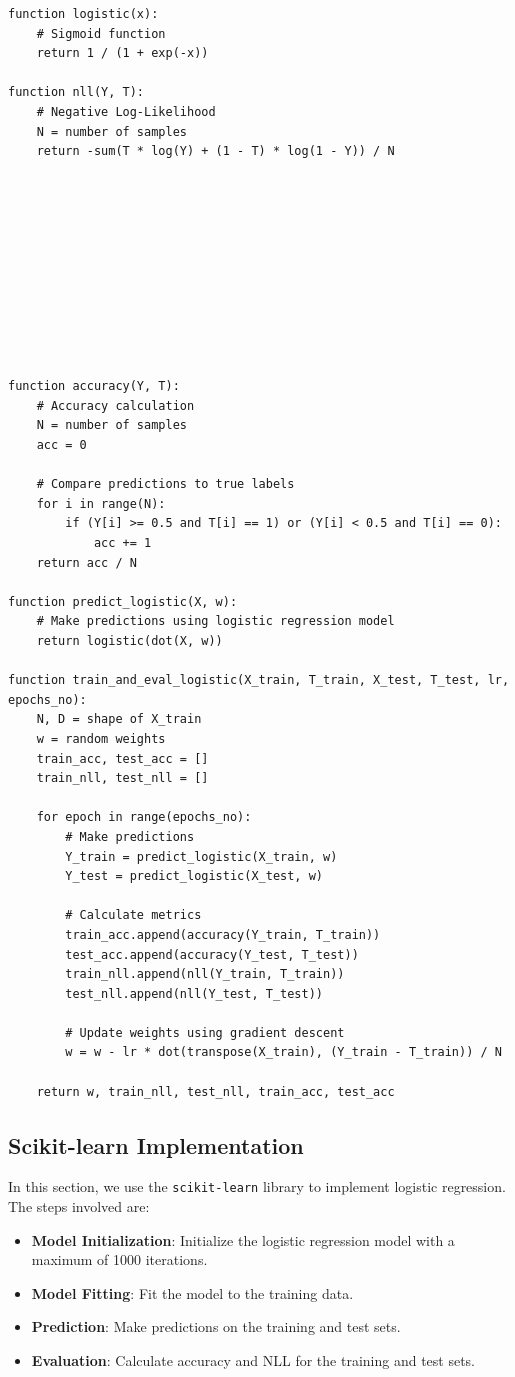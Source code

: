 \documentclass[a4paper,12pt]{article}
\begin{document}
\begin{verbatim}
function logistic(x):
    # Sigmoid function
    return 1 / (1 + exp(-x))

function nll(Y, T):
    # Negative Log-Likelihood
    N = number of samples
    return -sum(T * log(Y) + (1 - T) * log(1 - Y)) / N











function accuracy(Y, T):
    # Accuracy calculation
    N = number of samples
    acc = 0

    # Compare predictions to true labels
    for i in range(N):
        if (Y[i] >= 0.5 and T[i] == 1) or (Y[i] < 0.5 and T[i] == 0):
            acc += 1
    return acc / N

function predict_logistic(X, w):
    # Make predictions using logistic regression model
    return logistic(dot(X, w))

function train_and_eval_logistic(X_train, T_train, X_test, T_test, lr, epochs_no):
    N, D = shape of X_train
    w = random weights
    train_acc, test_acc = []
    train_nll, test_nll = []

    for epoch in range(epochs_no):
        # Make predictions
        Y_train = predict_logistic(X_train, w)
        Y_test = predict_logistic(X_test, w)

        # Calculate metrics
        train_acc.append(accuracy(Y_train, T_train))
        test_acc.append(accuracy(Y_test, T_test))
        train_nll.append(nll(Y_train, T_train))
        test_nll.append(nll(Y_test, T_test))

        # Update weights using gradient descent
        w = w - lr * dot(transpose(X_train), (Y_train - T_train)) / N

    return w, train_nll, test_nll, train_acc, test_acc
\end{verbatim}

\subsection{Scikit-learn Implementation}
In this section, we use the \texttt{scikit-learn} library to implement logistic regression. The steps involved are:

\begin{itemize}
    \item \textbf{Model Initialization}: Initialize the logistic regression model with a maximum of 1000 iterations.
    \item \textbf{Model Fitting}: Fit the model to the training data.
    \item \textbf{Prediction}: Make predictions on the training and test sets.
    \item \textbf{Evaluation}: Calculate accuracy and NLL for the training and test sets.
\end{itemize}
\end{document}
